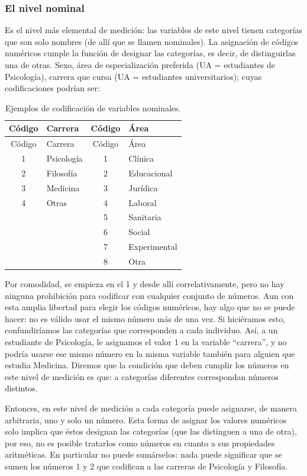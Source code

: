 \documentclass[]{book}
\begin{document}
\hypertarget{el-nivel-nominal}{%
\subsubsection{El nivel nominal}\label{el-nivel-nominal}}

Es el nivel más elemental de medición: las variables de este nivel tienen categorías que son solo nombres (de allí que se llamen nominales). La asignación de códigos numéricos cumple la función de designar las categorías, es decir, de distinguirlas una de otras. Sexo, área de especialización preferida (UA = estudiantes de Psicología), carrera que cursa (UA = estudiantes universitarios); cuyas codificaciones podrían ser:

\begin{longtable}[]{@{}clcl@{}}
\caption{\label{tab:nivelNomCod}Ejemplos de codificación de variables nominales.}\tabularnewline
\toprule
Código & Carrera & Código & Área\tabularnewline
\midrule
\endfirsthead
\toprule
Código & Carrera & Código & Área\tabularnewline
\midrule
\endhead
1 & Psicología & 1 & Clínica\tabularnewline
2 & Filosofía & 2 & Educacional\tabularnewline
3 & Medicina & 3 & Jurídica\tabularnewline
4 & Otras & 4 & Laboral\tabularnewline
& & 5 & Sanitaria\tabularnewline
& & 6 & Social\tabularnewline
& & 7 & Experimental\tabularnewline
& & 8 & Otra\tabularnewline
\bottomrule
\end{longtable}

Por comodidad, se empieza en el 1 y desde allí correlativamente, pero no hay ninguna prohibición para codificar con cualquier conjunto de números. Aun con esta amplia libertad para elegir los códigos numéricos, hay algo que no se puede hacer: no es válido usar el mismo número más de una vez. Si hiciéramos esto, confundiríamos las categorías que corresponden a cada individuo. Así, a un estudiante de Psicología, le asignamos el valor 1 en la variable ``carrera'', y no podría usarse ese mismo número en la misma variable también para alguien que estudia Medicina. Diremos que la condición que deben cumplir los números en este nivel de medición es que: a categorías diferentes correspondan números distintos.

Entonces, en este nivel de medición a cada categoría puede asignarse, de manera arbitraria, uno y solo un número. Esta forma de asignar los valores numéricos solo implica que éstos designan las categorías (que las distinguen a una de otra), por eso, no es posible tratarlos como números en cuanto a sus propiedades aritméticas. En particular no puede sumárselos: nada puede significar que se sumen los números 1 y 2 que codifican a las carreras de Psicología y Filosofía.
\end{document}
